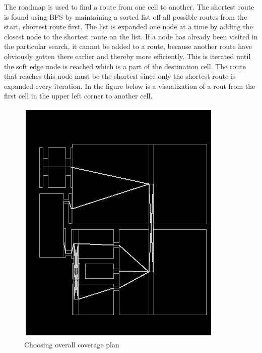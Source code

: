 The roadmap is used to find a route from one cell to another. The shortest route
is found using BFS by maintaining a sorted list off all possible routes from the
start, shortest route first. The list is expanded one node at a time by adding
the closest node to the shortest route on the list. If a node has already been
visited in the particular search, it cannot be added to a route, because another
route have obviously gotten there earlier and thereby more efficiently. This is
iterated until the soft edge node is reached which is a part of the destination
cell. The route that reaches this node must be the shortest since only the
shortest route is expanded every iteration. In the figure below is a
visualization of a rout from the first cell in the upper left corner to another
cell.

\begin{figure}[htb] \centering \includegraphics[width=\textwidth,trim=0 0 0
0]{graphics/pic1.png}
	\caption{Choosing overall coverage plan}
	\label{fig:Choosingoverallcoverageplan}			
\end{figure}


